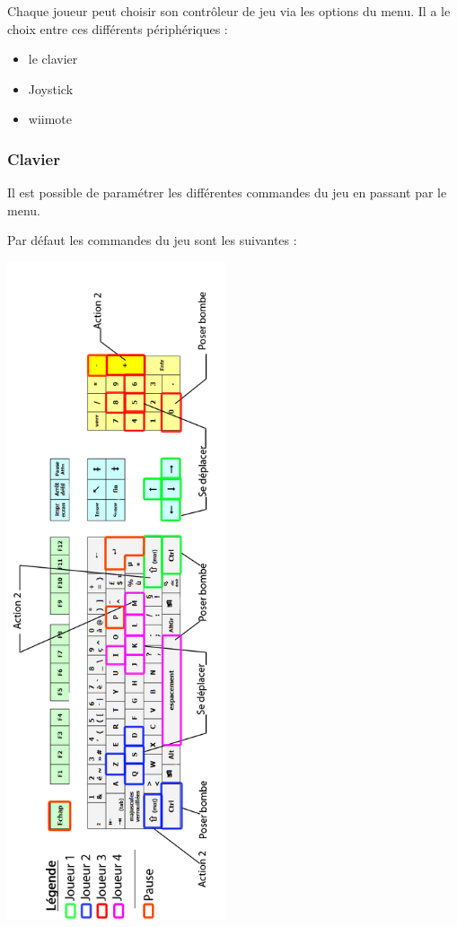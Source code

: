 Chaque joueur peut choisir son contrôleur de jeu via les options du menu. Il a le choix entre ces différents périphériques :

\begin{itemize}
	\item le clavier
	\item Joystick
	\item wiimote
\end{itemize}
	
	
\subsubsection{Clavier}
Il est possible de paramétrer les différentes commandes du jeu en passant par le menu.

Par défaut les commandes du jeu sont les suivantes :

\begin{center}
	\includegraphics[height=550pt]{images/clavier}
\end{center}

